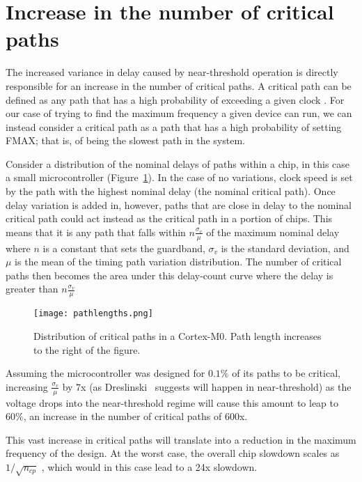 \section{Increase in the number of critical paths}
\label{sec:criticalpaths}

The increased variance in delay caused by near-threshold operation is directly responsible for an increase in the number of critical paths.
A critical path can be defined as any path that has a high probability of exceeding a given clock \cite{Wang:2004bw}.
For our case of trying to find the maximum frequency a given device can run, we can instead consider a critical path as a path that has a high probability of setting FMAX; that is, of being the slowest path in the system.
  
Consider a distribution of the nominal delays of paths within a chip, in this case a small microcontroller (Figure~\ref{fig:normal}).
In the case of no variations, clock speed is set by the path with the highest nominal delay (the nominal critical path).
Once delay variation is added in, however, paths that are close in delay to the nominal critical path could act instead as the critical path in a portion of chips.
This means that it is any path that falls within $n\frac{\sigma_v}{\mu}$ of the maximum nominal delay where $n$ is a constant that sets the guardband, $\sigma_v$ is the standard deviation, and $\mu$ is the mean of the timing path variation distribution.
The number of critical paths then becomes the area under this delay-count curve where the delay is greater than $n\frac{\sigma_v}{\mu}$
 
\begin{figure}[thpb]
    \centering
    \texttt{[image: pathlengths.png]}
    \caption{Distribution of critical paths in a Cortex-M0. Path length increases to the right of the figure.}
    \label{fig:normal}
\end{figure}
 
Assuming the microcontroller was designed for $0.1\%$ of its paths to be critical, increasing $\frac{\sigma_v}{\mu}$ by 7x (as Dreslinski~\cite{Dreslinski:2010ez} suggests will happen in near-threshold) as the voltage drops into the near-threshold regime will cause this amount  to leap to $60\%$, an increase in the number of critical paths of 600x.

This vast increase in critical paths will translate into a reduction in the maximum frequency of the design. At the worst case, the overall chip slowdown scales as $1/\sqrt{n_{cp}}$ \cite{Bowman:2002cp}, which would in this case lead to a 24x slowdown.
